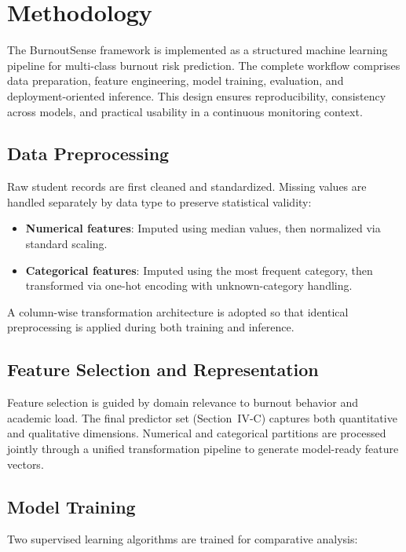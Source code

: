 \documentclass[conference]{IEEEtran}
\begin{document}
\section{Methodology}

The BurnoutSense framework is implemented as a structured machine learning pipeline for multi-class burnout risk prediction. The complete workflow comprises data preparation, feature engineering, model training, evaluation, and deployment-oriented inference. This design ensures reproducibility, consistency across models, and practical usability in a continuous monitoring context.

\subsection{Data Preprocessing}

Raw student records are first cleaned and standardized. Missing values are handled separately by data type to preserve statistical validity:
\begin{itemize}[leftmargin=*]
    \item \textbf{Numerical features}: Imputed using median values, then normalized via standard scaling.
    \item \textbf{Categorical features}: Imputed using the most frequent category, then transformed via one-hot encoding with unknown-category handling.
\end{itemize}
A column-wise transformation architecture is adopted so that identical preprocessing is applied during both training and inference.

\subsection{Feature Selection and Representation}

Feature selection is guided by domain relevance to burnout behavior and academic load. The final predictor set (Section~IV-C) captures both quantitative and qualitative dimensions. Numerical and categorical partitions are processed jointly through a unified transformation pipeline to generate model-ready feature vectors.

\subsection{Model Training}

Two supervised learning algorithms are trained for comparative analysis:
\end{document}
